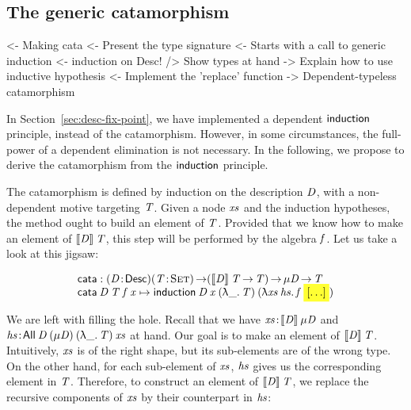 \subsection{The generic catamorphism}

\begin{wstructure}
<- Making cata
    <- Present the type signature
    <- Starts with a call to generic induction
        <- induction on Desc!
        /> Show types at hand
        -> Explain how to use inductive hypothesis
    <- Implement the 'replace' function
    -> Dependent-typeless catamorphism 
\end{wstructure}

In Section~\ref{sec:desc-fix-point}, we have implemented a dependent
$\F{induction}$ principle, instead of the catamorphism. However, in
some circumstances, the full-power of a dependent elimination is not
necessary. In the following, we propose to derive the catamorphism
from the $\F{induction}$ principle.

The catamorphism is defined by induction on the description $\V{D}$,
with a non-dependent motive targeting $\V{T}$. Given a node $\V{xs}$
and the induction hypotheses, the method ought to build an element of
$\V{T}$. Provided that we know how to make an element of
$\descop{\V{D}}{\V{T}}$, this step will be performed by the algebra
$\V{f}$. Let us take a look at this jigsaw:

\newcommand{\cata}{\F{cata}}

\[\stk{
\cata : \PITEL{\V{D}}{\Desc}
           \PI{\V{T}}{\Set}
           (\descop{\V{D}}{\V{T}} \To \V{T}) \To 
           \Mu{\V{D}} \To \V{T} \\
\cata\: \V{D}\: \V{T}\: \V{f\: \V{x}} \mapsto
  \F{induction}\: \V{D}\:\V{x}\: (\LAM{\_}\V{T})\: (\LAM{\V{xs}\:\V{hs}} \V{f}\: \SHED)
}\]

We are left with filling the hole. Recall that we have
\(\Bhab{\V{xs}}{\descop{\V{D}}{\Mu{\V{D}}}}\) and
\(\Bhab{\V{hs}}{\All{\V{D}}{(\Mu{\V{D}})}{(\LAM{\_} \V{T})}{\V{xs}}}\)
at hand. Our goal is to make an element of
\(\descop{\V{D}}{\V{T}}\). Intuitively, $\V{xs}$ is of the right
shape, but its sub-elements are of the wrong type. On the other hand,
for each sub-element of $\V{xs}$, $\V{hs}$ gives us the corresponding
element in $\V{T}$.  Therefore, to construct an element of
\(\descop{\V{D}}{\V{T}}\), we replace the recursive components of
\(\V{xs}\) by their counterpart in \(\V{hs}\):

